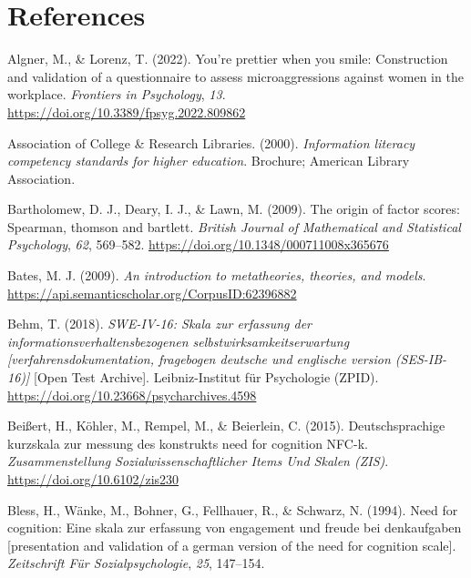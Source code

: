 \documentclass[
  12pt,
  a4paper,
  twoside]{article}
\newlength{\cslhangindent}
\newenvironment{CSLReferences}[2] %
 {\begin{list}{}{%
  \setlength{\itemindent}{0pt}
  \setlength{\leftmargin}{0pt}
  \setlength{\parsep}{0pt}
  \ifodd #1
   \setlength{\leftmargin}{\cslhangindent}
   \setlength{\itemindent}{-1\cslhangindent}
  \fi
  \setlength{\itemsep}{#2\baselineskip}}}
 {\end{list}}
\begin{document}
\section*{References}\label{references}

\label{refs}
\begin{CSLReferences}{1}{0}
Algner, M., \& Lorenz, T. (2022). You're prettier when you smile: Construction and validation of a questionnaire to assess microaggressions against women in the workplace. \emph{Frontiers in Psychology}, \emph{13}. \url{https://doi.org/10.3389/fpsyg.2022.809862}

Association of College \& Research Libraries. (2000). \emph{Information literacy competency standards for higher education}. Brochure; American Library Association.

Bartholomew, D. J., Deary, I. J., \& Lawn, M. (2009). The origin of factor scores: Spearman, thomson and bartlett. \emph{British Journal of Mathematical and Statistical Psychology}, \emph{62}, 569--582. \url{https://doi.org/10.1348/000711008x365676}

Bates, M. J. (2009). \emph{An introduction to metatheories, theories, and models}. \url{https://api.semanticscholar.org/CorpusID:62396882}

Behm, T. (2018). \emph{SWE-IV-16: Skala zur erfassung der informationsverhaltensbezogenen selbstwirksamkeitserwartung {[}verfahrensdokumentation, fragebogen deutsche und englische version (SES-IB-16){]}} {[}Open Test Archive{]}. Leibniz-Institut für Psychologie (ZPID). \url{https://doi.org/10.23668/psycharchives.4598}

Beißert, H., Köhler, M., Rempel, M., \& Beierlein, C. (2015). Deutschsprachige kurzskala zur messung des konstrukts need for cognition NFC-k. \emph{Zusammenstellung Sozialwissenschaftlicher Items Und Skalen (ZIS)}. \url{https://doi.org/10.6102/zis230}

Bless, H., Wänke, M., Bohner, G., Fellhauer, R., \& Schwarz, N. (1994). Need for cognition: Eine skala zur erfassung von engagement und freude bei denkaufgaben {[}presentation and validation of a german version of the need for cognition scale{]}. \emph{Zeitschrift Für Sozialpsychologie}, \emph{25}, 147--154.


\end{CSLReferences}
\end{document}
